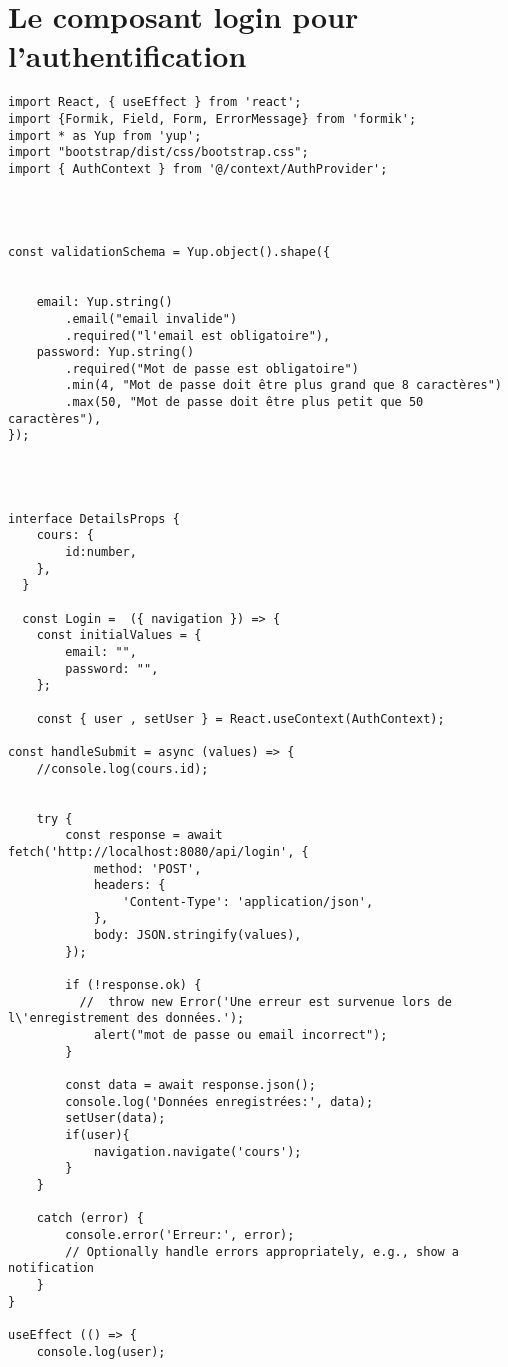 \documentclass[10pt,a4paper]{article}
\begin{document}
\section{Le composant login pour l'authentification}
\begin{verbatim}
import React, { useEffect } from 'react';
import {Formik, Field, Form, ErrorMessage} from 'formik';
import * as Yup from 'yup';
import "bootstrap/dist/css/bootstrap.css";
import { AuthContext } from '@/context/AuthProvider';

  


const validationSchema = Yup.object().shape({
   
 
    email: Yup.string()
        .email("email invalide")
        .required("l'email est obligatoire"),
    password: Yup.string()
        .required("Mot de passe est obligatoire")
        .min(4, "Mot de passe doit être plus grand que 8 caractères")
        .max(50, "Mot de passe doit être plus petit que 50 caractères"),
});




interface DetailsProps {
    cours: {
        id:number,
    },
  }

  const Login =  ({ navigation }) => {
    const initialValues = {
        email: "",
        password: "",
    };

    const { user , setUser } = React.useContext(AuthContext);
  
const handleSubmit = async (values) => {
    //console.log(cours.id);
    
    
    try {
        const response = await fetch('http://localhost:8080/api/login', {
            method: 'POST',
            headers: {
                'Content-Type': 'application/json',
            },
            body: JSON.stringify(values),
        });

        if (!response.ok) {
          //  throw new Error('Une erreur est survenue lors de l\'enregistrement des données.');
            alert("mot de passe ou email incorrect");
        }

        const data = await response.json();
        console.log('Données enregistrées:', data);
        setUser(data);
        if(user){
            navigation.navigate('cours');
        }
    }
    
    catch (error) {
        console.error('Erreur:', error);
        // Optionally handle errors appropriately, e.g., show a notification
    }
}

useEffect (() => {  
    console.log(user);
    

\end{verbatim}
\end{document}
